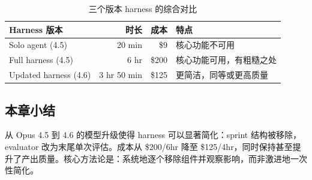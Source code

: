 \begin{table}[H]
\centering
\begin{tabular}{lrrp{5cm}}
\toprule
\textbf{Harness 版本} & \textbf{时长} & \textbf{成本} & \textbf{特点} \\
\midrule
Solo agent (4.5) & 20 min & \$9 & 核心功能不可用 \\
Full harness (4.5) & 6 hr & \$200 & 核心功能可用，有粗糙之处 \\
Updated harness (4.6) & 3 hr 50 min & \$125 & 更简洁，同等或更高质量 \\
\bottomrule
\end{tabular}
\caption{三个版本 harness 的综合对比}
\end{table}

\subsection{本章小结}

从 Opus 4.5 到 4.6 的模型升级使得 harness 可以显著简化：sprint 结构被移除，evaluator 改为末尾单次评估。成本从 \$200/6hr 降至 \$125/4hr，同时保持甚至提升了产出质量。核心方法论是：系统地逐个移除组件并观察影响，而非激进地一次性简化。


